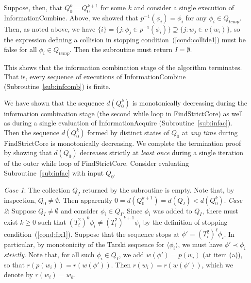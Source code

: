 \documentclass[11pt,reqno]{amsart}
\theoremstyle{definition}
\numberwithin{equation}{section}
\newcommand{\inv}{^{-1}}
\newcommand{\lag}{\langle}
\newcommand{\rag}{\rangle}
\newcommand{\pre}{\phi}
\newcommand{\pe}{\prec}
\newcommand{\acto}{Q_0}
\newcommand{\actok}{Q_0^k}
\newcommand{\actc}{Q_I}
\newcommand{\actt}{Q_{temp}}
\newcommand{\disto}{d}
\newcommand{\infacstoptha}{(a)\xspace}
\begin{document}
Suppose, then, that $\actok = \acto^{k+1}$ for some $k$ and consider a single execution of InformationCombine. 
Above, we showed that $p\inv(\pre_i) = \pre_i$ for any $\pre_i \in \actt$.
Then, as noted above, we have $\{i\} = \{j: \pre_j \in p\inv(\pre_i)\} \supseteq \{j: w_j \in c(w_i)\}$, so the expression defining a collision in stopping condition~(\ref{cond:collide1}) must be false for all $\pre_i \in \actt$. Then the subroutine must return $I = \emptyset$. 

This shows that the information combination stage of the algorithm terminates.
That is, every sequence of executions of InformationCombine (Subroutine~\ref{sub:infcomb}) is finite.

We have shown that the sequence $\disto(\actok)$ is monotonically decreasing during the information combination stage (the second while loop in FindStrictCore) as well as during a single evaluation of InformationAcquire (Subroutine~\ref{sub:infac}).
Then the sequence $\disto(\actok)$ formed by distinct states of $\acto$ at \emph{any time} during FindStrictCore is monotonically decreasing.  
We complete the termination proof by showing that $\disto(\acto)$ decreases strictly at \emph{least once} during a single iteration of the outer while loop of FindStrictCore.
Consider evaluating Subroutine~\ref{sub:infac} with input $\acto$. 

\emph{Case 1}: The collection $\actc$ returned by the subroutine is empty.
Note that, by inspection, $\acto \not = \emptyset$. 
Then apparently $0 = \disto(\acto^{k+1}) = \disto(\actc) < \disto(\actok)$.
\emph{Case 2}: Suppose $\actc \not = \emptyset$ and consider $\pre_i \in \actc$.
Since $\pre_i$ was added to $\actc$, there must exist $k \geq 0$ such that $(T_i^2)^k \pre_i \not = (T_i^2)^{k+1} \pre_i$ by the definition of stopping condition~(\ref{cond:fix1}).  
Suppose that the sequence stops at $\pre' = (T_i^2)^{\ell} \pre_i$.
In particular, by monotonicity of the Tarski sequence for $\lag \pre_i \rag$, we must have $\pre' \pe \pre_i$ \emph{strictly}.
Note that, for all such $\pre_i \in \actc$, we add $w(\pre') = p(w_i)$ (at item \infacstoptha), so that $r(p(w_i)) = r(w(\pre'))$.
Then $r(w_i) = r(w(\pre'))$, which we denote by $r(w_i) = w_k$.
\end{document}
